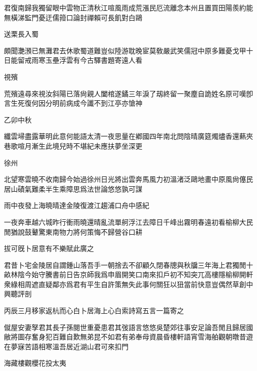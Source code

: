 \documentclass{zhvt-classic-Miya}
\begin{document}
君復南歸我獨留眼中雲物正清秋江喧風雨成荒漲民厄流離念本州且置買田陽羨約能無橫涕監門憂迂儒箝口論封禪賴可長飢對白鷗

\begin{fw}送栗長入蜀\end{fw}

頗聞灔澦已無灘君去休歌蜀道難豈似陸游耽晚宦莫敎嚴武笑儒冠中原多難憂戈甲十日能留戒雨寒玉壘浮雲有今古驛書題寄遠人看

\begin{fw}視殯\end{fw}

荒殯遠尋來視汝斜陽已落尙親人闔棺遂鐍三年淚了刼終留一聚塵自詭姓名原可嘆卽言生死復何因分明前病成今讖不到江亭亦愴神

\begin{fw}乙卯中秋\end{fw}

纖雲埽盡露華明此意何能語太清一夜思量在鄕國四年南北問陰晴廣筵燭燼香還爇夾巷歌喧月漸生此境兒時不堪紀未應扶夢坐深更

\begin{fw}徐州\end{fw}

北望寒雲曉不收南歸今始過徐州日光將出雲奔馬風力初溫渚泛鷗地畫中原風尙僿民居山磧氣難柔半生乘障思爲法世論悠悠孰可謀

\begin{fw}雨中夜發上海曉晴達金陵復渡江趨浦口舟中感紀\end{fw}

一夜奔車越六城昨行衝雨曉還晴亂流單舸浮江去障日千峰出霧明春遠初看榆柳大民閒猶說鼓鼙驚東南物力將何策悔不歸營谷口耕

\begin{fw}拔可旣卜居意有不樂賦此廣之\end{fw}

君昔卜宅金陵居自謂鍾山落吾手一朝捨去不卻顧久閉春牕與秋牖三年海上君獨閒十畝林陰今始守騰書前日告京師我爲申眉開笑口南來扣戶初不知突兀高樓隱榆柳開軒衆綠相周遮直疑鄰亦爲君有平生自許策無失此事何關狂以狃當前快意豈偶然草創中興聽評剖

\begin{fw}丙辰三月移家返杭而心白卜居海上心白索詩寫五言一篇寄之\end{fw}

僦屋安妻孥君其長子孫閱世重憂患君其弢語言悠悠吳楚郊往事安足論吾閒且歸居國敝將圖存奮身犯百難自歎無弟昆不如君有弟奉母資晨昏樓軒語宵雪海舶觀朝暾昔遊在夢寐苦語相寒溫吾居近湖山君可來扣門

\begin{fw}海藏樓觀櫻花投太夷\end{fw}
\end{document}
